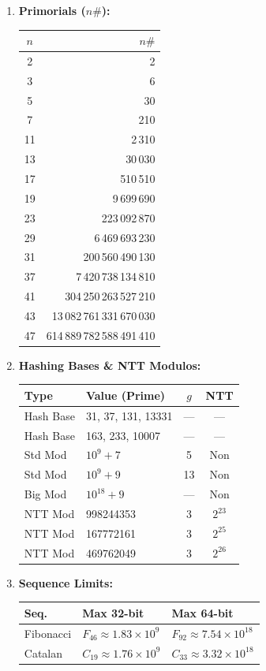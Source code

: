 \begin{enumerate}
    \item \textbf{Primorials ($n\#$):}
    \begin{tabular}{|c|r|}
        \hline
        $n$ & $n\#$ \\ \hline
        2 & 2 \\ \hline
        3 & 6 \\ \hline
        5 & 30 \\ \hline
        7 & 210 \\ \hline
        11 & 2\,310 \\ \hline
        13 & 30\,030 \\ \hline
        17 & 510\,510 \\ \hline
        19 & 9\,699\,690 \\ \hline
        23 & 223\,092\,870 \\ \hline
        29 & 6\,469\,693\,230 \\ \hline
        31 & 200\,560\,490\,130 \\ \hline
        37 & 7\,420\,738\,134\,810 \\ \hline
        41 & 304\,250\,263\,527\,210 \\ \hline
        43 & 13\,082\,761\,331\,670\,030 \\ \hline
        47 & 614\,889\,782\,588\,491\,410 \\ \hline
    \end{tabular}

    \item \textbf{Hashing Bases \& NTT Modulos:}
    \begin{tabular}{|p{1.2cm}|p{2.3cm}|c|c|}
        \hline
        \textbf{Type} & \textbf{Value (Prime)} & \textbf{$g$} & \textbf{NTT} \\ \hline
        Hash Base & 31, 37, 131, 13331 & — & — \\ \hline
        Hash Base & 163, 233, 10007 & — & — \\ \hline
        Std Mod & $10^9 + 7$ & 5 & Non \\ \hline
        Std Mod & $10^9 + 9$ & 13 & Non \\ \hline
        Big Mod & $10^{18} + 9$ & — & Non \\ \hline
        NTT Mod & 998244353 & 3 & $2^{23}$ \\ \hline
        NTT Mod & 167772161 & 3 & $2^{25}$ \\ \hline
        NTT Mod & 469762049 & 3 & $2^{26}$ \\ \hline
    \end{tabular}

    \item \textbf{Sequence Limits:}
    \begin{tabular}{|p{1.2cm}|p{2.0cm}|p{2.0cm}|}
        \hline
        \textbf{Seq.} & \textbf{Max 32-bit} & \textbf{Max 64-bit} \\ \hline
        Fibonacci & $F_{46} \approx 1.83 \times 10^9$ & $F_{92} \approx 7.54 \times 10^{18}$ \\ \hline
        Catalan & $C_{19} \approx 1.76 \times 10^9$ & $C_{33} \approx 3.32 \times 10^{18}$ \\ \hline
    \end{tabular}
\end{enumerate}


